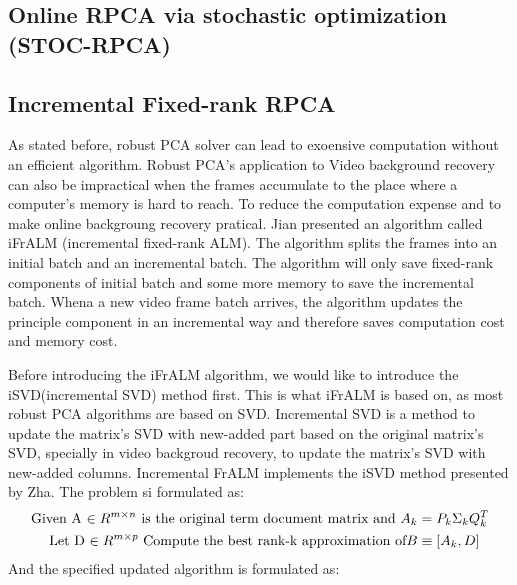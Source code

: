 \documentclass[oneside]{article}
\begin{document}
\subsection{Online RPCA via stochastic optimization (STOC-RPCA)}
\subsection{Incremental Fixed-rank RPCA}
As stated before, robust PCA solver can lead to exoensive computation without an efficient algorithm. Robust PCA's application to Video background recovery can also be impractical when the frames accumulate to the place where a computer's memory is hard to reach. To reduce the computation expense and to make online backgroung recovery pratical. Jian presented an algorithm called iFrALM (incremental fixed-rank ALM). The algorithm splits the frames into an initial batch and an incremental batch. The algorithm will only save fixed-rank components of initial batch and some more memory to save the incremental batch. Whena a new video frame batch arrives, the algorithm updates the principle component in an incremental way and therefore saves computation cost and memory cost.

Before introducing the iFrALM algorithm, we would like to introduce the iSVD(incremental SVD) method first. This is what iFrALM is based on, as most robust PCA algorithms are based on SVD. Incremental SVD is a method to update the matrix's SVD with new-added part based on the original matrix's SVD, specially in video backgroud recovery, to update the matrix's SVD with new-added columns. Incremental FrALM implements the iSVD method presented by Zha. The problem si formulated as:
\begin{align*}
\text{Given A $ \in R^{m \times n}$ is the original term document matrix and } A_k &= P_k \Sigma_k Q_k^T \\ \text{Let D $\in R^{m \times p}$ Compute the best rank-k approximation of} B &\equiv [A_k, D]
\end{align*}
And the specified updated algorithm is formulated as:
\end{document}
